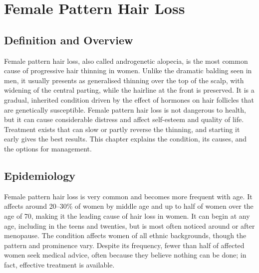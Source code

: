 \chapter{Female Pattern Hair Loss}

\section*{Definition and Overview}
Female pattern hair loss, also called androgenetic alopecia, is the most common cause of progressive hair thinning in women. Unlike the dramatic balding seen in men, it usually presents as generalised thinning over the top of the scalp, with widening of the central parting, while the hairline at the front is preserved. It is a gradual, inherited condition driven by the effect of hormones on hair follicles that are genetically susceptible. Female pattern hair loss is not dangerous to health, but it can cause considerable distress and affect self-esteem and quality of life. Treatment exists that can slow or partly reverse the thinning, and starting it early gives the best results. This chapter explains the condition, its causes, and the options for management.

\section*{Epidemiology}
Female pattern hair loss is very common and becomes more frequent with age. It affects around 20--30\% of women by middle age and up to half of women over the age of 70, making it the leading cause of hair loss in women. It can begin at any age, including in the teens and twenties, but is most often noticed around or after menopause. The condition affects women of all ethnic backgrounds, though the pattern and prominence vary. Despite its frequency, fewer than half of affected women seek medical advice, often because they believe nothing can be done; in fact, effective treatment is available.

